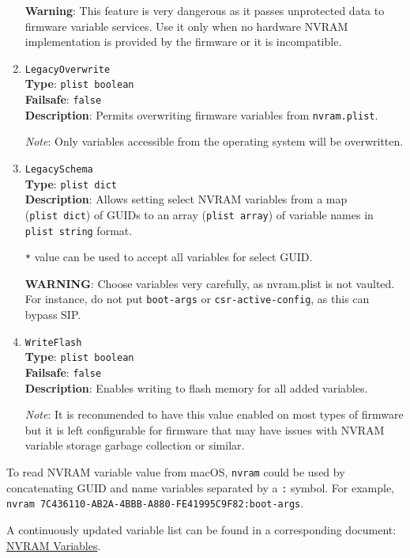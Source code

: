 \documentclass[]{article}
\begin{document}
\begin{enumerate}
  \textbf{Warning}: This feature is very dangerous as it passes unprotected data to
  firmware variable services. Use it only when no hardware NVRAM implementation is provided
  by the firmware or it is incompatible.

\item
  \texttt{LegacyOverwrite}\\
  \textbf{Type}: \texttt{plist\ boolean}\\
  \textbf{Failsafe}: \texttt{false}\\
  \textbf{Description}: Permits overwriting firmware variables from \texttt{nvram.plist}.

  \emph{Note}: Only variables accessible from the operating system will be overwritten.

\item
  \texttt{LegacySchema}\\
  \textbf{Type}: \texttt{plist\ dict}\\
  \textbf{Description}: Allows setting select NVRAM variables from a map
  (\texttt{plist\ dict}) of GUIDs to an array (\texttt{plist\ array}) of
  variable names in \texttt{plist\ string} format.

  \texttt{*} value can be used to accept all variables for select GUID.

  \textbf{WARNING}: Choose variables very carefully, as nvram.plist is not vaulted.
  For instance, do not put \texttt{boot-args} or \texttt{csr-active-config}, as
  this can bypass SIP.

\item
  \texttt{WriteFlash}\\
  \textbf{Type}: \texttt{plist\ boolean}\\
  \textbf{Failsafe}: \texttt{false}\\
  \textbf{Description}: Enables writing to flash memory for all added variables.

  \emph{Note}: It is recommended to have this value enabled on most types of firmware but it is
  left configurable for firmware that may have issues with NVRAM variable storage
  garbage collection or similar.

\end{enumerate}

To read NVRAM variable value from macOS, \texttt{nvram} could be used
by concatenating GUID and name variables separated by a \texttt{:} symbol.
For example, \texttt{nvram 7C436110-AB2A-4BBB-A880-FE41995C9F82:boot-args}.

A continuously updated variable list can be found in a corresponding document:
\href{https://docs.google.com/spreadsheets/d/1HTCBwfOBkXsHiK7os3b2CUc6k68axdJYdGl-TyXqLu0}{NVRAM Variables}.
\end{document}
